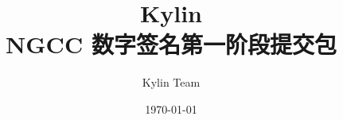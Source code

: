 \documentclass[sigconf,anonymous]{paper/build/acmart}
\begin{document}
\fancyhead{}
\def\thetitle{Kylin \\ NGCC 数字签名第一阶段提交包}
\title{\thetitle}
\date{\today}
\author{Kylin Team}

\maketitle

\clearpage

\tableofcontents

\clearpage












\appendix

\end{document}
